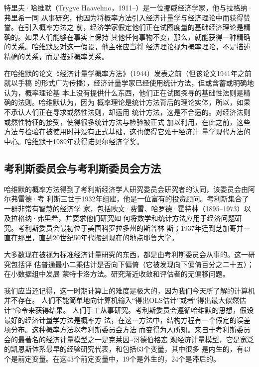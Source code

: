 特里夫·哈维默（Trygve Haavelmo，1911--）是一位挪威经济学家，他与拉格纳·弗里希一同
从事研究，他因为将概率方法引入经济计量学与经济理论中而获得赞誉。在引入概率方法之
前，经济学家假定他们正在试图度量的基础经济理论是精确的。如果人们能够在事实上保持
其他任何事物不变，那么，就能获得一种精确的关系。哈维默反对这一假设，他主张应当将
经济理论视为概率理论，不是描述精确的关系，而是描述概率关系。

在哈维默的论文《经济计量学概率方法》（1944）发表之前（但该论文1941年之前就以手稿
的形式广为传播），经济计量学家已经使用统计方法，但或含蓄或明确地认为，概率理论基
本上没有提供什么东西，他们正在试图探寻的基础性法则是精确的法则。哈维默认为，因为
概率理论是统计方法背后的理论实体，所以，如果不承认人们正在寻求或然性法则，却运用
统计方法，这是不合适的。对经济法则或然性特征的接受，使得很多统计方法与检验被正式
加以利用，在此之前，这些方法与检验在被使用时并没有正式基础，这也使得它处于经济计
量学现代方法的中心。哈维默于1989年获得诺贝尔经济学奖。

\subsection{考利斯委员会与考利斯委员会方法}

哈维默的概率方法得到了考利斯经济学人研究委员会研究者的认同，该委员会由阿尔弗雷德·考
利斯三世于1932年组建，他是一位富有的投资顾问。考利斯集合了一群非常有智慧的经济学
家，包括欧文·费雪、哈罗德·霍特林（1895--1973）以及拉格纳·弗里希，并要求他们研究如
何将数学和统计方法应用于经济问题研究。考利斯委员会最初位于美国科罗拉多州的斯普林
斯；1937年迁到芝加哥并一直在那里，直到20世纪50年代搬到现在的地点耶鲁大学。

大多数现在被视为标准经济计量研究的东西，都是由考利斯委员会从事的。这一研究包括评
估普通最小二乘估计是否向下偏倚（它被发现向下偏倚百分之二十五）；在小数据组中发展
蒙特卡洛方法。研究渐近收敛和评估者的无偏移问题。

我们应当还记得，这一时期计算上的难度是极大的，因为我们今天所了解的计算机并不存在。
人们不能简单地向计算机输入“得出OLS估计”或者“得出最大似然估计”命令来获得结果。
人们手工从事研究。考利斯委员会遵循哈维默的思想，假设最好的经济计量学方法是概率方
法，在这一方法中，结构方程有一个假定的误差项分布。这种概率方法以考利斯委员会方法
而变得为人所知。来自于考利斯委员会的最著名的经济计量模型之一是克莱因--哥德伯格宏
观经济计量模型，它是宽泛的凯恩斯体系最早的经验研究代表，和包括63个变量，其中很多
是内生的，有43个是前定变量。在这43个前定变量中，19个是外生的，24个是滞后的。

